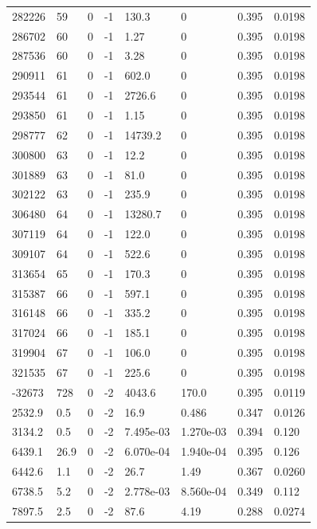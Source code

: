 \documentclass[preview]{standalone}
\begin{document}
{{{{{{\begin{tabular}{L{1.2cm}C{1.2cm} C{0.3cm}C{0.5cm} C{1.4cm}C{1.4cm} C{1.4cm}C{1.4cm}}
  282226  &    59  & 0     & -1 &  130.3  & 0  & 0.395 &  0.0198   \\ 
  286702  &    60  & 0     & -1 &  1.27  & 0  & 0.395 &  0.0198   \\ 
  287536  &    60  & 0     & -1 &  3.28  & 0  & 0.395 &  0.0198   \\ 
  290911  &    61  & 0     & -1 &  602.0  & 0  & 0.395 &  0.0198   \\ 
  293544  &    61  & 0     & -1 &  2726.6  & 0  & 0.395 &  0.0198   \\ 
  293850  &    61  & 0     & -1 &  1.15  & 0  & 0.395 &  0.0198   \\ 
  298777  &    62  & 0     & -1 &  14739.2  & 0  & 0.395 &  0.0198   \\ 
  300800  &    63  & 0     & -1 &  12.2  & 0  & 0.395 &  0.0198   \\ 
  301889  &    63  & 0     & -1 &  81.0  & 0  & 0.395 &  0.0198   \\ 
  302122  &    63  & 0     & -1 &  235.9  & 0  & 0.395 &  0.0198   \\ 
  306480  &    64  & 0     & -1 &  13280.7  & 0  & 0.395 &  0.0198   \\ 
  307119  &    64  & 0     & -1 &  122.0  & 0  & 0.395 &  0.0198   \\ 
  309107  &    64  & 0     & -1 &  522.6  & 0  & 0.395 &  0.0198   \\ 
  313654  &    65  & 0     & -1 &  170.3  & 0  & 0.395 &  0.0198   \\ 
  315387  &    66  & 0     & -1 &  597.1  & 0  & 0.395 &  0.0198   \\ 
  316148  &    66  & 0     & -1 &  335.2  & 0  & 0.395 &  0.0198   \\ 
  317024  &    66  & 0     & -1 &  185.1  & 0  & 0.395 &  0.0198   \\ 
  319904  &    67  & 0     & -1 &  106.0  & 0  & 0.395 &  0.0198   \\ 
  321535  &    67  & 0     & -1 &  225.6  & 0  & 0.395 &  0.0198   \\ 
  -32673  &   728  & 0     & -2 &  4043.6  & 170.0  & 0.395 &  0.0119   \\ 
  2532.9  &   0.5  & 0     & -2 &  16.9  & 0.486  & 0.347 &  0.0126   \\ 
  3134.2  &   0.5  & 0     & -2 &  7.495e-03  & 1.270e-03  & 0.394 &  0.120   \\ 
  6439.1  &  26.9  & 0     & -2 &  6.070e-04  & 1.940e-04  & 0.395 &  0.126   \\ 
  6442.6  &   1.1  & 0     & -2 &  26.7  & 1.49  & 0.367 &  0.0260   \\ 
  6738.5  &   5.2  & 0     & -2 &  2.778e-03  & 8.560e-04  & 0.349 &  0.112   \\ 
  7897.5  &   2.5  & 0     & -2 &  87.6  & 4.19  & 0.288 &  0.0274   \\ 
\hline 
\end{tabular} 

}}}}}}
\end{document}
